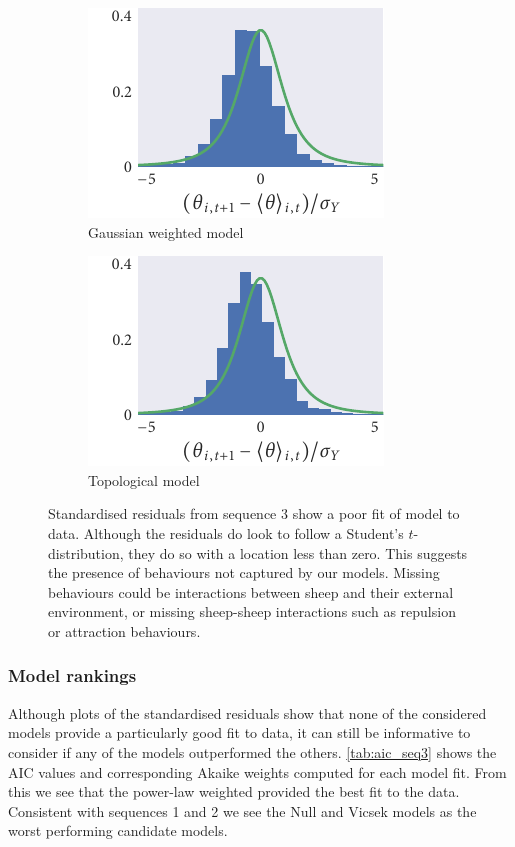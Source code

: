 \begin{figure}[tbp]
\begin{subfigure}[t]{0.33333\textwidth}
  \end{subfigure}%
  \begin{subfigure}[t]{0.33333\textwidth}
    \includegraphics{seq3/gauss_residuals.pdf}
    \caption{Gaussian weighted model}
  \end{subfigure}%
  \begin{subfigure}[t]{0.33333\textwidth}
    \includegraphics{seq3/top_residuals.pdf}
    \caption{Topological model}
  \end{subfigure}
  \caption{Standardised residuals from sequence 3 show a poor fit of model to
    data. Although the residuals do look to follow a Student's $t$-distribution,
    they do so with a location less than zero. This suggests the presence of
    behaviours not captured by our models. Missing behaviours could be
    interactions between sheep and their external environment, or missing
    sheep-sheep interactions such as repulsion or attraction behaviours.}
  \label{fig:residuals_seq3}
\end{figure}

\subsubsection{Model rankings}

Although plots of the standardised residuals show that none of the considered
models provide a particularly good fit to data, it can still be informative to
consider if any of the models outperformed the others. \cref{tab:aic_seq3}
shows the AIC values and corresponding Akaike weights computed for each model
fit. From this we see that the power-law weighted provided the best fit to the
data. Consistent with sequences 1 and 2 we see the Null and Vicsek models
as the worst performing candidate models.


